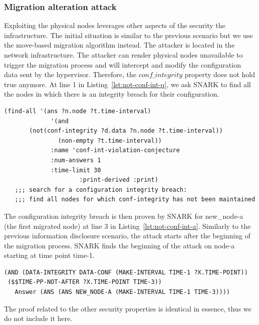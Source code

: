 \subsubsection{Migration alteration attack}
Exploiting the physical nodes leverages other aspects of the security the infrastructure.
The initial situation is similar to the previous scenario but we use the move-based migration algorithm instead.
The attacker is located in the network infrastructure.
The attacker can render physical nodes unavailable to trigger the migration process and will intercept and modify the configuration data sent by the hypervisor. 
Therefore, the $conf\_integrity$ property does not hold true anymore.
At line 1 in Listing~\ref{lst:not-conf-int-q}, we ask SNARK to find all the nodes in which there is an integrity breach for their configuration.

\begin{lstlisting}[caption=SNARK question to detect the configuration integrity violation., label=lst:not-conf-int-q,captionpos=b] 
   (find-all '(ans ?n.node ?t.time-interval)
             '(and
       (not(conf-integrity ?d.data ?n.node ?t.time-interval))
               (non-empty ?t.time-interval))
             :name 'conf-int-violation-conjecture
             :num-answers 1
             :time-limit 30
                     :print-derived :print)
   ;;; search for a configuration integrity breach:
   ;;; find all nodes for which conf-integrity has not been maintained
\end{lstlisting}
The configuration integrity breach is then proven by SNARK for new\_node-a (the first migrated node) at line 3 in Listing~\ref{lst:not-conf-int-a}.
Similarly to the previous information disclosure scenario, the attack starts after the beginning of the migration process.
SNARK finds the beginning of the attack on node-a starting at time point time-1.

\begin{lstlisting}[caption=SNARK detecting the configuration integrity violation., label=lst:not-conf-int-a,captionpos=b] 
(AND (DATA-INTEGRITY DATA-CONF (MAKE-INTERVAL TIME-1 ?X.TIME-POINT))
 ($$TIME-PP-NOT-AFTER ?X.TIME-POINT TIME-3))
   Answer (ANS (ANS NEW_NODE-A (MAKE-INTERVAL TIME-1 TIME-3)))) 
\end{lstlisting}

The proof related to the other security properties is identical in essence, thus we do not include it here.
